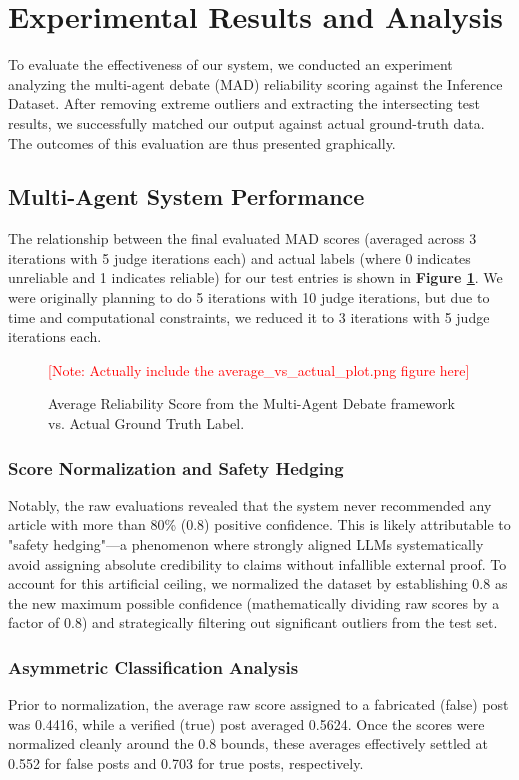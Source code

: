 \documentclass[sigconf,nonacm]{acmart}
\begin{document}
\section{Experimental Results and Analysis}\label{sec:results}
To evaluate the effectiveness of our system, we conducted an experiment analyzing the multi-agent debate (MAD) reliability scoring against the Inference Dataset. After removing extreme outliers and extracting the intersecting test results, we successfully matched our output against actual ground-truth data. The outcomes of this evaluation are thus presented graphically.

\subsection{Multi-Agent System Performance}
The relationship between the final evaluated MAD scores (averaged across 3 iterations with 5 judge iterations each) and actual labels (where 0 indicates unreliable and 1 indicates reliable) for our test entries is shown in \textbf{Figure \ref{fig:mad_scores}}. We were originally planning to do 5 iterations with 10 judge iterations, but due to time and computational constraints, we reduced it to 3 iterations with 5 judge iterations each.

\begin{figure}[h]
    \centering
    \textcolor{red}{[Note: Actually include the average\_vs\_actual\_plot.png figure here]}
    \caption{Average Reliability Score from the Multi-Agent Debate framework vs. Actual Ground Truth Label.}
    \label{fig:mad_scores}
\end{figure}

\subsubsection*{Score Normalization and Safety Hedging}
Notably, the raw evaluations revealed that the system never recommended any article with more than 80\% (0.8) positive confidence. This is likely attributable to "safety hedging"—a phenomenon where strongly aligned LLMs systematically avoid assigning absolute credibility to claims without infallible external proof. To account for this artificial ceiling, we normalized the dataset by establishing 0.8 as the new maximum possible confidence (mathematically dividing raw scores by a factor of 0.8) and strategically filtering out significant outliers from the test set.

\subsubsection*{Asymmetric Classification Analysis}
Prior to normalization, the average raw score assigned to a fabricated (false) post was 0.4416, while a verified (true) post averaged 0.5624. Once the scores were normalized cleanly around the 0.8 bounds, these averages effectively settled at 0.552 for false posts and 0.703 for true posts, respectively.
\end{document}
